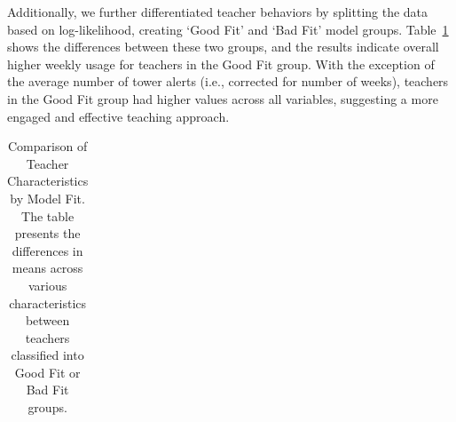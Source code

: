 \documentclass[
  number,
  preprint,
  3p,
  onecolumn]{elsarticle}
\begin{document}
Additionally, we further differentiated teacher behaviors by splitting
the data based on log-likelihood, creating `Good Fit' and `Bad Fit'
model groups. Table~\ref{tbl-CBM-teachers-full} shows the differences
between these two groups, and the results indicate overall higher weekly
usage for teachers in the Good Fit group. With the exception of the
average number of tower alerts (i.e., corrected for number of weeks),
teachers in the Good Fit group had higher values across all variables,
suggesting a more engaged and effective teaching approach.

\begin{longtable}[]{@{}
  >{\raggedright\arraybackslash}p{}
  >{\centering\arraybackslash}p{}
  >{\centering\arraybackslash}p{}
  >{\centering\arraybackslash}p{}
  >{\centering\arraybackslash}p{}
  >{\centering\arraybackslash}p{}
  >{\centering\arraybackslash}p{}@{}}

\caption{\label{tbl-CBM-teachers-full}Comparison of Teacher
Characteristics by Model Fit. The table presents the differences in
means across various characteristics between teachers classified into
Good Fit or Bad Fit groups.}

\tabularnewline


\end{longtable}
\end{document}

